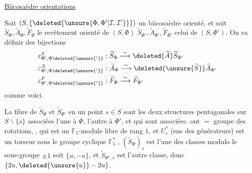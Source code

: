\uline{Biicosaèdre  orientations}

Soit $(S,\{\deleted{\unsure{\Phi,\Phi'|\mathcal I,\mathcal I'}}\})$ un biicosaèdre  orienté, et soit
$\widetilde S_\Phi,\widetilde A_\Phi,\widetilde F_\Phi$ le revêtement  orienté de $(S,\Phi)$
$\widetilde S_{\Phi'},\widetilde A_{\Phi'},\widetilde F_{\Phi'}$ celui de $(S,\Phi')$.
 On va définir des
bijections
\[
\begin{aligned}
\varepsilon^S_{\Phi',\Phi\deleted{\unsure{'}}}&:\widetilde S_\Phi\mathrel{\overset{\sim}{\longrightarrow}}\deleted{\widetilde A}\widetilde S_{\Phi'}\\
\varepsilon^A_{\Phi',\Phi\deleted{\unsure{'}}}&:\widetilde A_\Phi\mathrel{\overset{\sim}{\longrightarrow}}\deleted{\unsure{\widetilde S}}\widetilde A_{\Phi'}\\
\varepsilon^F_{\Phi',\Phi\deleted{\unsure{'}}}&:\widetilde F_\Phi\mathrel{\overset{\sim}{\longrightarrow}}\widetilde F_{\Phi'}
\end{aligned}
\]
comme voici.

 La fibre de $\widetilde S_\Phi$ et $\widetilde S_{\Phi'}$ en un point $s\in S$ sont les
deux  structures pentagonales sur $S\smallsetminus\{s\}$ associées
 l'une à $\Phi$, l'autre à $\Phi'$, et qui sont associées. 
ont $=$ groupe des rotations, ,  qui
est un  $\mathbb F_5$-module libre de rang $1$,
et $U_s^*$ (ens des générateurs) est un torseur sous le groupe cyclique
$\mathbb F_5^*$ , 
$(\widetilde S_\Phi)_s$ est l'une des classes modulo le sous-groupe $\pm1$
soit $\{u,-u\}$, et $\widetilde S_{\Phi',s}$ est l'autre classe, donc
$\{2u,\deleted{\unsure{u}}-2u\}$.

